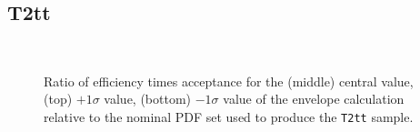 
\clearpage
\subsection{T2tt\label{app:t2tt}}


%
\begin{figure}[h!]
  \begin{center}
    \\
    \caption{\label{fig:sms-pdf-t2tt}Ratio of efficiency times
      acceptance for the (middle) central value, (top) $+1\sigma$
      value, (bottom) $-1\sigma$ value of the envelope calculation
      relative to the nominal PDF set used to produce the
      \texttt{T2tt} sample. }
  \end{center}
\end{figure}

